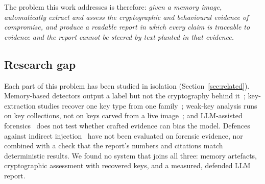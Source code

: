 The problem this work addresses is therefore: \emph{given a memory image, automatically extract and assess the
cryptographic and behavioural evidence of compromise, and produce a readable report in which every claim is
traceable to evidence and the report cannot be steered by text planted in that evidence.}

\subsection{Research gap}
Each part of this problem has been studied in isolation (Section~\ref{sec:related}). Memory-based detectors
output a label but not the cryptography behind it~\cite{carrier2022detecting}; key-extraction studies recover
one key type from one family~\cite{babiano2023evaluation,baier2024tls}; weak-key analysis runs on key
collections, not on keys carved from a live image~\cite{pelofske2024efficient}; and LLM-assisted
forensics~\cite{oh2024volgpt,sharma2025forensicllm} does not test whether crafted evidence can bias the model.
Defences against indirect injection~\cite{hines2024spotlighting,liu2024formalizing} have not been evaluated on
forensic evidence, nor combined with a check that the report's numbers and citations match deterministic
results. We found no system that joins all three: memory artefacts, cryptographic assessment with recovered
keys, and a measured, defended LLM report.

